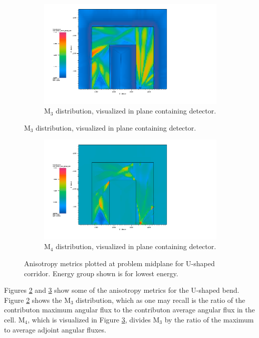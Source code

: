 \begin{figure}[htb!]
  \centering
  \begin{subfigure}[t]{\textwidth}
    \includegraphics[width=0.9\linewidth]{./chapters/characterization_probs/figures/char/prob_2/prob2M3G26.png}
    \caption{M$_3$ distribution, visualized in plane containing detector.}
    \label{fig:ubendM3}
  \end{subfigure}
\end{figure}
\begin{figure}[htb!]\ContinuedFloat
  \centering
  \begin{subfigure}[t]{\textwidth}
    \includegraphics[width=0.9\linewidth]{./chapters/characterization_probs/figures/char/prob_2/prob2M4G26.png}
    \caption{M$_4$ distribution, visualized in plane containing detector.}
    \label{fig:ubendM4}
  \end{subfigure}
  \caption[Anisotropy metrics plotted at problem midplane for U-shaped
  corridor.]{Anisotropy metrics plotted at problem midplane for U-shaped
    corridor. Energy group shown is for lowest energy.}
  \label{fig:ubendmetrics}
\end{figure}

Figures \ref{fig:ubendM3} and \ref{fig:ubendM4} show some of the anisotropy metrics for
the U-shaped bend. Figure \ref{fig:ubendM3} shows the M$_3$ distribution, which
as one may recall is the ratio of the contributon maximum angular flux to the
contributon average angular flux in the cell. M$_4$, which is visualized in
Figure \ref{fig:ubendM4}, divides M$_3$ by the ratio of the maximum to average
adjoint angular fluxes.

